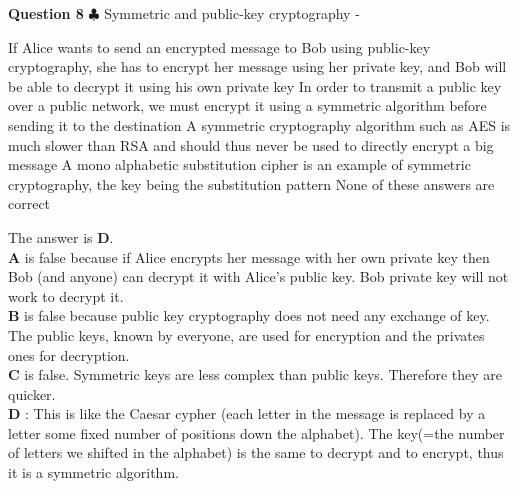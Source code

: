 \documentclass[en]{sourcefiles/eplexam}
\newcounter{choice}
\renewcommand\thechoice{\textbf{\Alph{choice}}}
\newcommand\choicelabel{\thechoice$\quad$}
\newenvironment{choices}%
  {\list{\choicelabel}%
     {\usecounter{choice}\def\makelabel##1{\hss\llap{##1}}%
       \settowidth{\leftmargin}{W.\hskip\labelsep\hskip 2.5em}%
       \def\choice{%
         \item
       } %
       \labelwidth\leftmargin\advance\labelwidth-\labelsep
       \topsep=0pt
       \partopsep=0pt
     }%
  }%
  {\endlist}
\begin{document}
\textbf{Question 8} $\clubsuit$ Symmetric and public-key cryptography
\begin{choices}
     \choice If Alice wants to send an encrypted message to Bob using public-key cryptography, she has to encrypt her message using her private key, and Bob will be able to decrypt it using his own private key
     \choice In order to transmit a public key over a public network, we must encrypt it using a symmetric algorithm before sending it to the destination
     \choice A symmetric cryptography algorithm such as AES is much slower than RSA and should thus never be used to directly encrypt a big message
     \choice A mono alphabetic substitution cipher is an example of symmetric cryptography, the key being the substitution pattern
     \choice None of these answers are correct
\end{choices}
\begin{solution}
The answer is \textbf{D}.\\
\textbf{A} is false because if Alice encrypts her message with her own private key then Bob (and anyone) can decrypt it with Alice's public key. Bob private key will not work to decrypt it.\\

\noindent \textbf{B} is false because public key cryptography does not need any exchange of key. The public keys, known by everyone, are used for encryption and the privates ones for decryption.\\

\noindent \textbf{C} is false. Symmetric keys are less complex than public keys. Therefore they are quicker. \\

\noindent \textbf{D} : This is like the Caesar cypher (each letter in the message is replaced by a letter some fixed number of positions down the alphabet). The key(=the number of letters we shifted in the alphabet) is the same to decrypt and to encrypt, thus it is a symmetric algorithm.
\end{solution}
\end{document}
